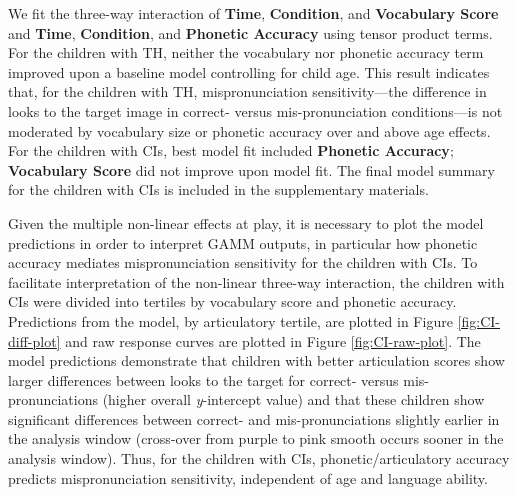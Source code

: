 \documentclass[
]{article}
\begin{document}
We fit the three-way interaction of \textbf{Time}, \textbf{Condition}, and \textbf{Vocabulary Score} and \textbf{Time}, \textbf{Condition}, and \textbf{Phonetic Accuracy} using tensor product terms. For the children with TH, neither the vocabulary nor phonetic accuracy term improved upon a baseline model controlling for child age. This result indicates that, for the children with TH, mispronunciation sensitivity---the difference in looks to the target image in correct- versus mis-pronunciation conditions---is not moderated by vocabulary size or phonetic accuracy over and above age effects. For the children with CIs, best model fit included \textbf{Phonetic Accuracy}; \textbf{Vocabulary Score} did not improve upon model fit. The final model summary for the children with CIs is included in the supplementary materials.

Given the multiple non-linear effects at play, it is necessary to plot the model predictions in order to interpret GAMM outputs, in particular how phonetic accuracy mediates mispronunciation sensitivity for the children with CIs. To facilitate interpretation of the non-linear three-way interaction, the children with CIs were divided into tertiles by vocabulary score and phonetic accuracy. Predictions from the model, by articulatory tertile, are plotted in Figure \ref{fig:CI-diff-plot} and raw response curves are plotted in Figure \ref{fig:CI-raw-plot}. The model predictions demonstrate that children with better articulation scores show larger differences between looks to the target for correct- versus mis-pronunciations (higher overall \emph{y}-intercept value) and that these children show significant differences between correct- and mis-pronunciations slightly earlier in the analysis window (cross-over from purple to pink smooth occurs sooner in the analysis window). Thus, for the children with CIs, phonetic/articulatory accuracy predicts mispronunciation sensitivity, independent of age and language ability.
\end{document}
